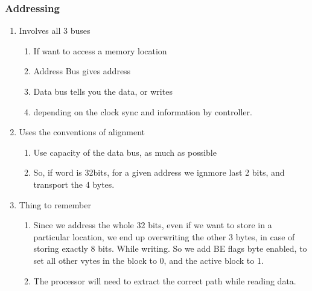 \documentclass[11pt, a4paper]{article}
\begin{document}
\subsubsection{Addressing}
\begin{enumerate}
    \item Involves all 3 buses
    \begin{enumerate}
        \item If want to access a memory location
        \item Address Bus gives address
        \item Data bus tells you the data, or writes
        \item depending on the clock sync and information by controller.
    \end{enumerate}
    \item Uses the conventions of alignment
    \begin{enumerate}
        \item Use capacity of the data bus, as much as possible
        \item So, if word is 32bits, for a given address we ignmore last 2 bits, and transport the 4 bytes.
    \end{enumerate}
    \item Thing to remember
    \begin{enumerate}
        \item Since we address the whole 32 bits, even if we want to store in a particular location, we end up overwriting the other 3 bytes, in case of storing exactly 8 bits. While writing. So we add BE flags byte enabled, to set all other vytes in the block to 0, and the active block to 1.
        \item The processor will need to extract the correct path while reading data.
    \end{enumerate}
\end{enumerate}
\end{document}
